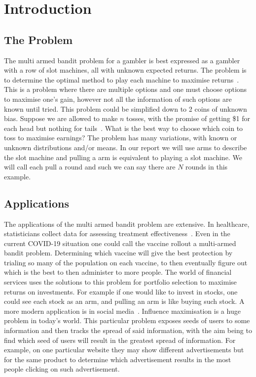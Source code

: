 \section{Introduction}\label{sec:introduction}

\subsection{The Problem}\label{subsec:the-problem}
The multi armed bandit problem for a gambler is best expressed as a gambler with a row of slot machines, all with unknown expected returns.
The problem is to determine the optimal method to play each machine to maximise returns~\citep{vermorel}.
This is a problem where there are multiple options and one must choose options to maximise one's gain, however not all the information of such options are known until tried.
\newline
\newline
This problem could be simplified down to 2 coins of unknown bias.
Suppose we are allowed to make $n$ tosses, with the promise of getting \$1 for each head but nothing for tails~\citep{robbins1952some}.
What is the best way to choose which coin to toss to maximise earnings?
The problem has many variations, with known or unknown distributions and/or means.
\newline
\newline
In our report we will use arms to describe the slot machine and pulling a arm is equivalent to playing a slot machine.
We will call each pull a round and such we can say there are $N$ rounds in this example.

\subsection{Applications}\label{subsec:applications}
The applications of the multi armed bandit problem are extensive.
In healthcare, statisticians collect data for assessing treatment effectiveness~\citep{bouneffouf2019survey}.
Even in the current COVID-19 situation one could call the vaccine rollout a multi-armed bandit problem.
Determining which vaccine will give the best protection by trialing so many of the population on each vaccine, to then eventually figure out which is the best to then administer to more people.
The world of financial services uses the solutions to this problem for portfolio selection to maximise returns on investments.
For example if one would like to invest in stocks, one could see each stock as an arm, and pulling an arm is like buying such stock.
\newline
\newline
A more modern application is in social media~\citep{chen2013combinatorial}.
Influence maximisation is a huge problem in today's world.
This particular problem exposes seeds of users to some information and then tracks the spread of said information, with the aim being to find which seed of users will result in the greatest spread of information.
For example, on one particular website they may show different advertisements but for the same product to determine which advertisement results in the most people clicking on such advertisement.

